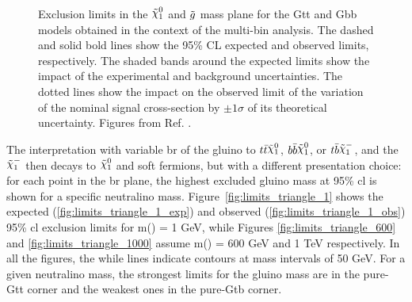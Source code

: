 \begin{figure}[htbp]
	\centering 
	\caption{Exclusion limits in the $\ninoone$ and $\tilde{g}$ mass plane
  		for the  Gtt and   Gbb models obtained
		in the context of the multi-bin analysis. The dashed and solid bold lines
		show the 95\% CL expected and observed limits, respectively. The
  		shaded bands around the expected limits show the
                impact of the
  		experimental and background uncertainties. The dotted
  		lines show the impact on the observed limit of the variation of the
  		nominal signal cross-section by $\pm 1 \sigma$ of its theoretical
  		uncertainty. 
  		Figures from Ref. \cite{ATLAS-CONF-2018-041}.	
      }
	\label{fig:limits_GbbGtt_R21}
\end{figure}

The interpretation with variable \gls{br} of the gluino to $ t \bar{t} \ninoone$, $ b \bar{b} \ninoone$, 
or $t \bar{b} \chinoonem$, and the $\chinoonem$ then decays to $\ninoone$ and soft fermions, but with a different 
presentation choice: for each point in the \gls{br} plane, the highest excluded gluino mass at 95\% \gls{cl}
is shown for a specific neutralino mass. 
Figure~\ref{fig:limits_triangle_1} shows the expected (\ref{fig:limits_triangle_1_exp}) and observed (\ref{fig:limits_triangle_1_obs}) 95\%
\gls{cl} exclusion limits for m(\ninoone) = 1 GeV, while Figures \ref{fig:limits_triangle_600} and \ref{fig:limits_triangle_1000} assume 
m(\ninoone) = 600 GeV and 1 TeV respectively. 
In all the figures, the while lines indicate contours at mass intervals of 50 GeV. 
For a given neutralino mass, the strongest limits for the gluino mass are in the pure-Gtt corner and the weakest ones in the 
pure-Gtb corner. 


